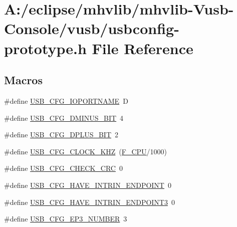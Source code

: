 \hypertarget{mhvlib-_vusb-_console_2vusb_2usbconfig-prototype_8h}{\section{A\-:/eclipse/mhvlib/mhvlib-\/\-Vusb-\/\-Console/vusb/usbconfig-\/prototype.h File Reference}
\label{mhvlib-_vusb-_console_2vusb_2usbconfig-prototype_8h}
}
\subsection*{Macros}
\begin{DoxyCompactItemize}
\item 
\#define \hyperlink{mhvlib-_vusb-_console_2vusb_2usbconfig-prototype_8h_a98ed17962b55543b35e10ae1f8ebe09b}{U\-S\-B\-\_\-\-C\-F\-G\-\_\-\-I\-O\-P\-O\-R\-T\-N\-A\-M\-E}~D
\item 
\#define \hyperlink{mhvlib-_vusb-_console_2vusb_2usbconfig-prototype_8h_a3a8bf6679cd70d1ddcc05024ffef9922}{U\-S\-B\-\_\-\-C\-F\-G\-\_\-\-D\-M\-I\-N\-U\-S\-\_\-\-B\-I\-T}~4
\item 
\#define \hyperlink{mhvlib-_vusb-_console_2vusb_2usbconfig-prototype_8h_a3005cdbb03c707af8007363632d7d02d}{U\-S\-B\-\_\-\-C\-F\-G\-\_\-\-D\-P\-L\-U\-S\-\_\-\-B\-I\-T}~2
\item 
\#define \hyperlink{mhvlib-_vusb-_console_2vusb_2usbconfig-prototype_8h_a9bf12dabd0e5186299ed0f13cd00dfeb}{U\-S\-B\-\_\-\-C\-F\-G\-\_\-\-C\-L\-O\-C\-K\-\_\-\-K\-H\-Z}~(\hyperlink{mhvlib-_vusb-_console_2vusb_2oddebug_8h_a43bafb28b29491ec7f871319b5a3b2f8}{F\-\_\-\-C\-P\-U}/1000)
\item 
\#define \hyperlink{mhvlib-_vusb-_console_2vusb_2usbconfig-prototype_8h_a57122aa75d9b598adcd238aee5f2b4b7}{U\-S\-B\-\_\-\-C\-F\-G\-\_\-\-C\-H\-E\-C\-K\-\_\-\-C\-R\-C}~0
\item 
\#define \hyperlink{mhvlib-_vusb-_console_2vusb_2usbconfig-prototype_8h_afe176bba6f05a034a5eec11f7ed6302b}{U\-S\-B\-\_\-\-C\-F\-G\-\_\-\-H\-A\-V\-E\-\_\-\-I\-N\-T\-R\-I\-N\-\_\-\-E\-N\-D\-P\-O\-I\-N\-T}~0
\item 
\#define \hyperlink{mhvlib-_vusb-_console_2vusb_2usbconfig-prototype_8h_a973c0b60531876ba52c4447e0fd0a150}{U\-S\-B\-\_\-\-C\-F\-G\-\_\-\-H\-A\-V\-E\-\_\-\-I\-N\-T\-R\-I\-N\-\_\-\-E\-N\-D\-P\-O\-I\-N\-T3}~0
\item 
\#define \hyperlink{mhvlib-_vusb-_console_2vusb_2usbconfig-prototype_8h_a6ba1def233ee0e102febe80e53af53a7}{U\-S\-B\-\_\-\-C\-F\-G\-\_\-\-E\-P3\-\_\-\-N\-U\-M\-B\-E\-R}~3

\end{DoxyCompactItemize}
